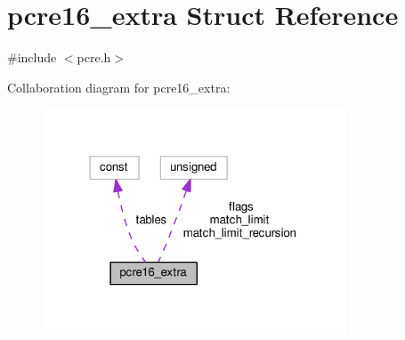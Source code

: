 \hypertarget{structpcre16__extra}{}\section{pcre16\+\_\+extra Struct Reference}
\label{structpcre16__extra}


{\ttfamily \#include $<$pcre.\+h$>$}



Collaboration diagram for pcre16\+\_\+extra\+:
\nopagebreak
\begin{figure}[H]
\begin{center}
\leavevmode
\includegraphics[width=255pt]{structpcre16__extra__coll__graph}
\end{center}
\end{figure}
